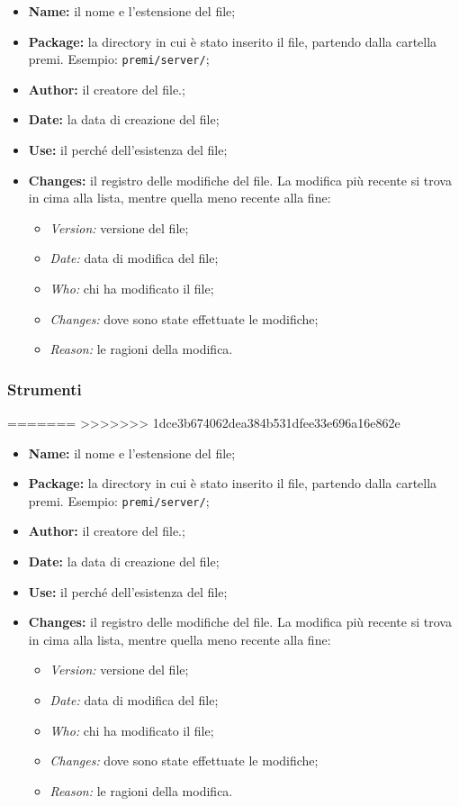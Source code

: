 \begin{itemize}
\item \textbf{Name:} il nome e l'estensione del file;
\item \textbf{Package:} la directory in cui è stato inserito il file, partendo dalla cartella premi. Esempio: \texttt{premi/server/};
\item \textbf{Author:} il creatore del file.;
\item \textbf{Date:} la data di creazione del file;
\item \textbf{Use:} il perché dell'esistenza del file;
\item \textbf{Changes:} il registro delle modifiche del file. La modifica più recente si trova in cima alla lista, mentre quella meno recente alla fine:
	\begin{itemize}
		\item \textit{Version:} versione del file;
		\item \textit{Date:} data di modifica del file;
		\item \textit{Who:} chi ha modificato il file;
		\item \textit{Changes:} dove sono state effettuate le modifiche;
		\item \textit{Reason:} le ragioni della modifica.
	\end{itemize}
\end{itemize}

\subsubsection{Strumenti}
=======
>>>>>>> 1dce3b674062dea384b531dfee33e696a16e862e
\begin{itemize}
\item \textbf{Name:} il nome e l'estensione del file;
\item \textbf{Package:} la directory in cui è stato inserito il file, partendo dalla cartella premi. Esempio: \texttt{premi/server/};
\item \textbf{Author:} il creatore del file.;
\item \textbf{Date:} la data di creazione del file;
\item \textbf{Use:} il perché dell'esistenza del file;
\item \textbf{Changes:} il registro delle modifiche del file. La modifica più recente si trova in cima alla lista, mentre quella meno recente alla fine:
	\begin{itemize}
		\item \textit{Version:} versione del file;
		\item \textit{Date:} data di modifica del file;
		\item \textit{Who:} chi ha modificato il file;
		\item \textit{Changes:} dove sono state effettuate le modifiche;
		\item \textit{Reason:} le ragioni della modifica.
	\end{itemize}
\end{itemize}

